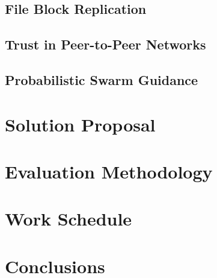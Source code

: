 \documentclass[runningheads]{llncs}
\begin{document}
\subsection{File Block Replication}
\subsection{Trust in Peer-to-Peer Networks}
\subsection{Probabilistic Swarm Guidance}

\newpage\section{Solution Proposal}\label{sec:proposal}

\section{Evaluation Methodology}\label{sec:methodology}

\section{Work Schedule}\label{sec:workschedule}

\section{Conclusions}\label{sec:conclusion}



\end{document}

